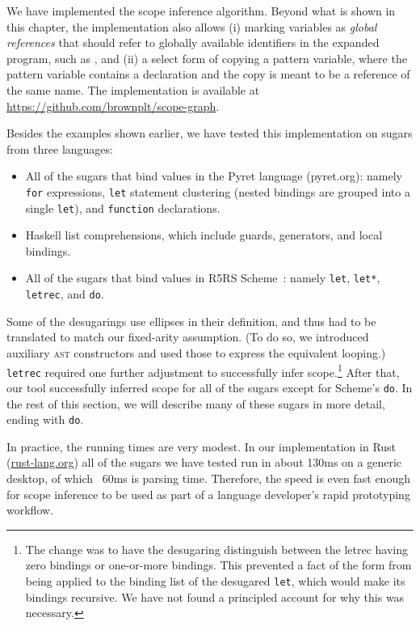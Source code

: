 We have implemented the scope inference algorithm. Beyond what is
shown in this chapter, the implementation also allows (i) marking
variables as \emph{global references} that should refer to globally
available identifiers in the expanded program, such as ,
and (ii) a select form of copying a pattern variable, where the pattern variable contains a
declaration and the copy is meant to be a reference of the same name.
The implementation is available at \url{https://github.com/brownplt/scope-graph}.

Besides the examples shown earlier, we have tested this
implementation on sugars from three languages:
\begin{itemize}
  \item All of the sugars that bind values in the Pyret language
    (pyret.org): namely \texttt{for} expressions, \texttt{let}
    statement clustering (nested bindings are grouped into a single
    \texttt{let}), and \texttt{function} declarations.
  \item Haskell list comprehensions, which include guards, generators,
    and local bindings.
  \item All of the sugars that bind values in R5RS
    Scheme~\cite{scheme5}: namely \texttt{let}, \texttt{let*},
    \texttt{letrec}, and \texttt{do}.
\end{itemize}

Some of the desugarings use ellipses in their definition, and thus had
to be translated to match our fixed-arity assumption. (To do so, we
introduced auxiliary \textsc{ast} constructors and used those to express the
equivalent looping.) \texttt{letrec}
required one further adjustment to successfully infer scope.\footnote{
  The change was to have the desugaring distinguish between the letrec
  having zero bindings or one-or-more bindings. This prevented a
  fact of the form  from being applied to the binding
  list of the desugared \texttt{let}, which would make its bindings
  recursive. We have not found a principled account for why this
  was necessary.
} After
that, our tool successfully inferred scope for all of the sugars
except for Scheme's \texttt{do}. In the rest of this section, we will
describe many of these sugars in more detail, ending with \texttt{do}.

In practice, the running times are very modest. In our implementation in
Rust (\url{rust-lang.org}) all of the sugars we have tested run in
about 130ms on a generic desktop, of which ~60ms is parsing
time. Therefore, the speed is even fast enough for scope inference to
be used as part of a language developer's rapid prototyping workflow.

